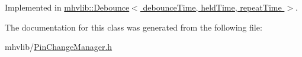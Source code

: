 Implemented in \hyperlink{classmhvlib_1_1_debounce_a48366cf03e885a4c739a9e5ab00be17e}{mhvlib\-::\-Debounce$<$ debounce\-Time, held\-Time, repeat\-Time $>$}.



The documentation for this class was generated from the following file\-:\begin{DoxyCompactItemize}
\item 
mhvlib/\hyperlink{_pin_change_manager_8h}{Pin\-Change\-Manager.\-h}\end{DoxyCompactItemize}
